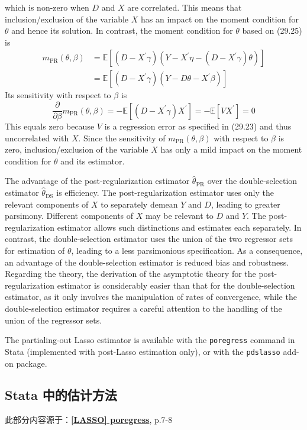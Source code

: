 {which is non-zero when $D$ and $X$ are correlated. This means that inclusion/exclusion of the variable $X$ has an impact on the moment condition for $\theta$ and hence its solution.
In contrast, the moment condition for $\theta$ based on (29.25) is
$$
\begin{aligned}
m_{\mathrm{PR}}(\theta, \beta) &=\mathbb{E}\left[\left(D-X^{\prime} \gamma\right)\left(Y-X^{\prime} \eta-\left(D-X^{\prime} \gamma\right) \theta\right)\right] \\
&=\mathbb{E}\left[\left(D-X^{\prime} \gamma\right)\left(Y-D \theta-X^{\prime} \beta\right)\right]
\end{aligned}
$$
Its sensitivity with respect to $\beta$ is
$$
\frac{\partial}{\partial \beta} m_{\mathrm{PR}}(\theta, \beta)=-\mathbb{E}\left[\left(D-X^{\prime} \gamma\right) X^{\prime}\right]=-\mathbb{E}\left[V X^{\prime}\right]=0
$$
This equals zero because $V$ is a regression error as specified in (29.23) and thus uncorrelated with $X$. Since the sensitivity of $m_{\mathrm{PR}}(\theta, \beta)$ with respect to $\beta$ is zero, inclusion/exclusion of the variable $X$ has only a mild impact on the moment condition for $\theta$ and its estimator.

The advantage of the post-regularization estimator $\widehat{\theta}_{\mathrm{PR}}$ over the double-selection estimator $\widehat{\theta}_{\mathrm{DS}}$ is efficiency. The post-regularization estimator uses only the relevant components of $X$ to separately demean $Y$ and $D$, leading to greater parsimony. Different components of $X$ may be relevant to $D$ and $Y$. The post-regularization estimator allows such distinctions and estimates each separately. In contrast, the double-selection estimator uses the union of the two regressor sets for estimation of $\theta$, leading to a less parsimonious specification. As a consequence, an advantage of the double-selection estimator is reduced bias and robustness. Regarding the theory, the derivation of the asymptotic theory for the post-regularization estimator is considerably easier than that for the double-selection estimator, as it only involves the manipulation of rates of convergence, while the double-selection estimator requires a careful attention to the handling of the union of the regressor sets.

The partialing-out Lasso estimator is available with the \texttt{poregress} command in Stata (implemented with post-Lasso estimation only), or with the \texttt{pdslasso} add-on package. 

\subsection{Stata 中的估计方法}
此部分内容源于：\href{https://www.stata.com/manuals/lassoporegress.pdf}{\bfseries{[\MakeUppercase{lasso}] poregress}}, p.7-8

}
